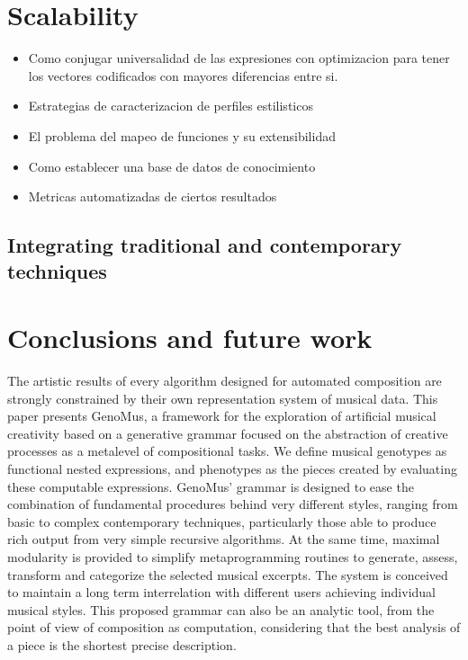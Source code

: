 \documentclass{article}
\begin{document}
\section{Scalability}
\begin{itemize}
\item Como conjugar universalidad de las expresiones con optimizacion para tener los vectores codificados con mayores diferencias entre si.
\item Estrategias de caracterizacion de perfiles estilisticos
\item El problema del mapeo de funciones y su extensibilidad
\item Como establecer una base de datos de conocimiento
\item Metricas automatizadas de ciertos resultados
\end{itemize}

\subsection{Integrating traditional and contemporary techniques}


\section{Conclusions and future work}

The artistic results of every algorithm designed for automated composition
are strongly constrained by their own representation
system of musical data. This paper presents GenoMus, a
framework for the exploration of artificial musical creativity
based on a generative grammar focused on the abstraction
of creative processes as a metalevel of compositional
tasks. We define musical genotypes as functional
nested expressions, and phenotypes as the pieces created
by evaluating these computable expressions. GenoMus' grammar is designed 
to ease the combination of fundamental procedures behind very different styles, ranging from basic to complex contemporary
techniques, particularly those able to produce rich
output from very simple recursive algorithms. At the same
time, maximal modularity is provided to simplify metaprogramming
routines to generate, assess, transform and categorize
the selected musical excerpts. The system is conceived
to maintain a long term interrelation with different
users achieving individual musical styles. This proposed
grammar can also be an analytic tool, from the point of
view of composition as computation, considering that the
best analysis of a piece is the shortest precise description.
\end{document}
